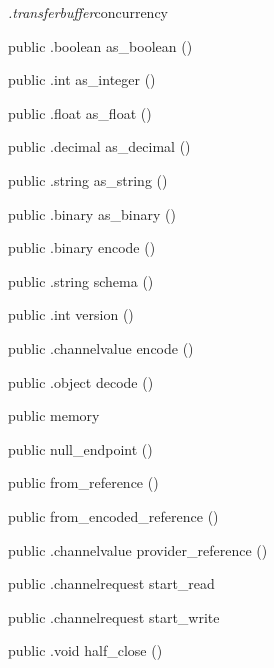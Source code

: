 \begin{CrexxClass}{\textit{.transferbuffer}}{concurrency}
\begin{Members}
    \Method
      {public}
      {.boolean}
      {as\_boolean}
      {()}

    \Method
      {public}
      {.int}
      {as\_integer}
      {()}

    \Method
      {public}
      {.float}
      {as\_float}
      {()}

    \Method
      {public}
      {.decimal}
      {as\_decimal}
      {()}

    \Method
      {public}
      {.string}
      {as\_string}
      {()}

    \Method
      {public}
      {.binary}
      {as\_binary}
      {()}

    \Method
      {public}
      {.binary}
      {encode}
      {()}

    \Method
      {public}
      {.string}
      {schema}
      {()}

    \Method
      {public}
      {.int}
      {version}
      {()}

    \Method
      {public}
      {.channelvalue}
      {encode}
      {()}

    \Method
      {public}
      {.object}
      {decode}
      {()}

    \Factory
      {public}
      {memory}
      {}

    \Factory
      {public}
      {null\_endpoint}
      {()}

    \Factory
      {public}
      {from\_reference}
      {()}

    \Factory
      {public}
      {from\_encoded\_reference}
      {()}

    \Method
      {public}
      {.channelvalue}
      {provider\_reference}
      {()}

    \Method
      {public}
      {.channelrequest}
      {start\_read}
      {}

    \Method
      {public}
      {.channelrequest}
      {start\_write}
      {}

    \Method
      {public}
      {.void}
      {half\_close}
      {()}


\end{Members}
\end{CrexxClass}
